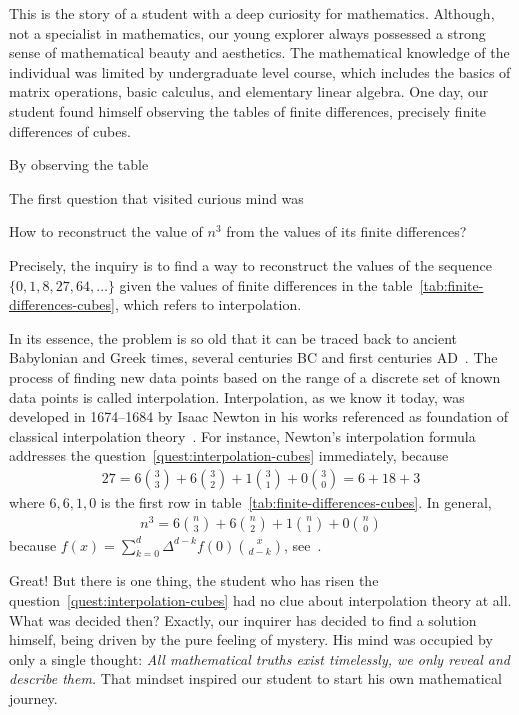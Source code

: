 This is the story of a student with a deep curiosity for mathematics.
Although, not a specialist in mathematics,
our young explorer always possessed a strong sense of mathematical beauty and aesthetics.
The mathematical knowledge of the individual was limited by undergraduate level course, which includes the basics of
matrix operations, basic calculus, and elementary linear algebra.
One day, our student found himself observing the tables of finite differences, precisely finite differences of cubes.

By observing the table

The first question that visited curious mind was
\begin{question}
    \label{quest:interpolation-cubes}
    How to reconstruct the value of $n^3$ from the values of its finite differences?
\end{question}
Precisely, the inquiry is to find a way to reconstruct the values of the sequence $\{0, 1, 8, 27, 64, \ldots\}$
given the values of finite differences in the table~\eqref{tab:finite-differences-cubes},
which refers to interpolation.

In its essence, the problem is so old that it can be traced back
to ancient Babylonian and Greek times, several centuries BC and first centuries AD~\cite{gautschi2012interpolation}.
The process of finding new data points based on the range of a discrete set
of known data points is called interpolation.
Interpolation, as we know it today, was developed in 1674--1684 by Isaac Newton
in his works referenced as foundation of classical interpolation theory~\cite{meijering2002chronology}.
For instance, Newton's interpolation formula addresses the question~\eqref{quest:interpolation-cubes} immediately,
because
\begin{align*}
    27 = 6 \binom{3}{3} + 6 \binom{3}{2} + 1 \binom{3}{1} + 0\binom{3}{0} = 6 + 18 + 3
\end{align*}
where $6,6,1,0$ is the first row in table~\eqref{tab:finite-differences-cubes}.
In general,
\begin{align*}
    n^3 = 6 \binom{n}{3} + 6 \binom{n}{2} + 1\binom{n}{1} + 0 \binom{n}{0}
\end{align*}
because $f(x) = \sum_{k=0}^{d} \Delta^{d-k} f(0) \binom{x}{d-k}$, see~\cite[~p. 190]{graham1994concrete}.

Great!
But there is one thing, the student who has risen the question~\eqref{quest:interpolation-cubes}
had no clue about interpolation theory at all.
What was decided then?
Exactly, our inquirer has decided to find a solution himself, being driven by the pure feeling of mystery.
His mind was occupied by only a single thought:
\textit{All mathematical truths exist timelessly, we only reveal and describe them.}
That mindset inspired our student to start his own mathematical journey.

